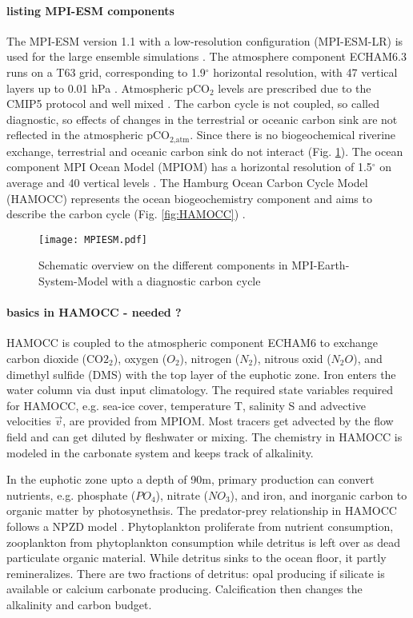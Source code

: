 \documentclass[12pt]{article}
\begin{document}
\paragraph{listing MPI-ESM components} The MPI-ESM version 1.1 with a low-resolution configuration (MPI-ESM-LR) is used for the large ensemble simulations \citep{Giorgetta2013}. The atmosphere component ECHAM6.3 runs on a T63 grid, corresponding to 1.9$^\circ$ horizontal resolution, with 47 vertical layers up to 0.01 hPa \citep{Stevens2013}. 
Atmospheric pCO$_2$ levels are prescribed due to the CMIP5 protocol and well mixed \citep{Taylor2012}. The carbon cycle is not coupled, so called diagnostic, so effects of changes in the terrestrial or oceanic carbon sink are not reflected in the atmospheric pCO$_{\text{2,atm}}$. Since there is no biogeochemical riverine exchange, terrestrial and oceanic carbon sink do not interact (Fig. \ref{fig:MPIESM}). The ocean component MPI Ocean Model (MPIOM) has a horizontal resolution of 1.5$^\circ$ on average and 40 vertical levels \citep{Jungclaus2013}. The Hamburg Ocean Carbon Cycle Model (HAMOCC) represents the ocean biogeochemistry component and aims to describe the carbon cycle (Fig. \ref{fig:HAMOCC}) \citep{Ilyina2013}. 

\begin{figure}[h!]
	\centering 
	\texttt{[image: MPIESM.pdf]}
	\caption{Schematic overview on the different components in MPI-Earth-System-Model with a diagnostic carbon cycle \citep{Giorgetta2013}}
	\label{fig:MPIESM}
\end{figure}

\paragraph{basics in HAMOCC - needed ?}


HAMOCC is coupled to the atmospheric component ECHAM6 to exchange carbon dioxide (CO$2_2$), oxygen ($O_2$), nitrogen ($N_2$), nitrous oxid ($N_2O$), and dimethyl sulfide (DMS) with the top layer of the euphotic zone. Iron enters the water column via dust input climatology. The required state variables required for HAMOCC, e.g. sea-ice cover, temperature T, salinity S and advective velocities $\vec{v}$, are provided from MPIOM. Most tracers get advected by the flow field and can get diluted by fleshwater or mixing. The chemistry in HAMOCC is modeled in the carbonate system and keeps track of alkalinity.

In the euphotic zone upto a depth of 90m, primary production can convert nutrients, e.g. phosphate ($PO_4$), nitrate ($NO_3$), and iron, and inorganic carbon to organic matter by photosynethsis.  The predator-prey relationship in HAMOCC follows a NPZD model \citep{Six1996}. Phytoplankton proliferate from nutrient consumption, zooplankton from phytoplankton consumption while detritus is left over as dead particulate organic material. While detritus sinks to the ocean floor, it partly remineralizes. There are two fractions of detritus: opal producing if silicate is available or calcium carbonate producing. Calcification then changes the alkalinity and carbon budget.
\end{document}
